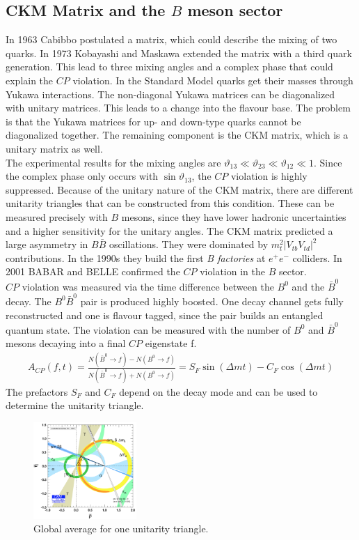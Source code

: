 \subsection{CKM Matrix and the $B$ meson sector}
In 1963 Cabibbo postulated a matrix, which could describe the mixing of two quarks. In 1973 Kobayashi and Maskawa extended the matrix with a third quark generation. This lead to three mixing angles and a complex phase that could explain the $CP$ violation. In the Standard Model quarks get their masses through Yukawa interactions. The non-diagonal Yukawa matrices can be diagonalized with unitary matrices. This leads to a change into the flavour base. The problem is that the Yukawa matrices for up- and down-type quarks cannot be diagonalized together. The remaining component is the CKM matrix, which is a unitary matrix as well.\\
The experimental results for the mixing angles are $\vartheta_{13} \ll \vartheta_{23} \ll \vartheta_{12} \ll 1$. Since the complex phase only occurs with $\sin\vartheta_{13}$, the $CP$ violation is highly suppressed. Because of the unitary nature of the CKM matrix, there are different unitarity triangles that can be constructed from this condition. These can be measured precisely with $B$ mesons, since they have lower hadronic uncertainties and a higher sensitivity for the unitary angles. The CKM matrix predicted a large asymmetry in $B\bar{B}$ oscillations. They were dominated by $m_t^2|V_{tb}V_{td}|^2$ contributions. In the 1990s they build the first \textit{B factories} at $e^+e^-$ colliders. In 2001 BABAR and BELLE confirmed the $CP$ violation in the $B$ sector.\\
$CP$ violation was measured via the time difference between the $B^0$ and the $\bar{B}^0$ decay. The $B^0\bar{B}^0$ pair is produced highly boosted. One decay channel gets fully reconstructed and one is flavour tagged, since the pair builds an entangled quantum state. The violation can be measured with the number of $B^0$ and $\bar{B}^0$ mesons decaying into a final $CP$ eigenstate f.
\begin{align*}
	A_{CP}(f,t) = \frac{N(\bar{B}^0 \rightarrow f) - N(B^0 \rightarrow f)} {N(\bar{B}^0 \rightarrow f) + N(B^0 \rightarrow f)} = S_F \sin(\Delta m t) -C_F \cos(\Delta m t)
\end{align*}
The prefactors $S_F$ and $C_F$ depend on the decay mode and can be used to determine the unitarity triangle.
\begin{figure}
	\center
  \includegraphics[width=0.35\textwidth]{graphics/CKM.png}
  \caption{Global average for one unitarity triangle. \cite{Kaonen}}
	\label{fig:CKM}
\end{figure}
